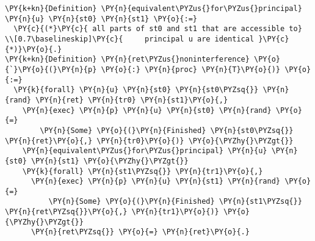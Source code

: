 \begin{BVerbatim}[commandchars=\\\{\},codes={\catcode`\$=3\catcode`\^=7\catcode`\_=8},fontsize=\footnotesize]
\PY{k+kn}{Definition} \PY{n}{equivalent\PYZus{}for\PYZus{}principal} \PY{n}{u} \PY{n}{st0} \PY{n}{st1} \PY{o}{:=}
  \PY{c}{(*}\PY{c}{ all parts of st0 and st1 that are accessible to}
\\[0.7\baselineskip]\PY{c}{     principal u are identical }\PY{c}{*)}\PY{o}{.}
\PY{k+kn}{Definition} \PY{n}{ret\PYZus{}noninterference} \PY{o}{`}\PY{o}{(}\PY{n}{p} \PY{o}{:} \PY{n}{proc} \PY{n}{T}\PY{o}{)} \PY{o}{:=}
  \PY{k}{forall} \PY{n}{u} \PY{n}{st0} \PY{n}{st0\PYZsq{}} \PY{n}{rand} \PY{n}{ret} \PY{n}{tr0} \PY{n}{st1}\PY{o}{,}
    \PY{n}{exec} \PY{n}{p} \PY{n}{u} \PY{n}{st0} \PY{n}{rand} \PY{o}{=}
        \PY{n}{Some} \PY{o}{(}\PY{n}{Finished} \PY{n}{st0\PYZsq{}} \PY{n}{ret}\PY{o}{,} \PY{n}{tr0}\PY{o}{)} \PY{o}{\PYZhy{}\PYZgt{}}
    \PY{n}{equivalent\PYZus{}for\PYZus{}principal} \PY{n}{u} \PY{n}{st0} \PY{n}{st1} \PY{o}{\PYZhy{}\PYZgt{}}
    \PY{k}{forall} \PY{n}{st1\PYZsq{}} \PY{n}{tr1}\PY{o}{,}
      \PY{n}{exec} \PY{n}{p} \PY{n}{u} \PY{n}{st1} \PY{n}{rand} \PY{o}{=}
          \PY{n}{Some} \PY{o}{(}\PY{n}{Finished} \PY{n}{st1\PYZsq{}} \PY{n}{ret\PYZsq{}}\PY{o}{,} \PY{n}{tr1}\PY{o}{)} \PY{o}{\PYZhy{}\PYZgt{}}
      \PY{n}{ret\PYZsq{}} \PY{o}{=} \PY{n}{ret}\PY{o}{.}
\end{BVerbatim}
